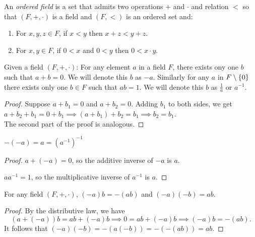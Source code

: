 \begin{defn} \label{defn:ordered field}
    An \emph{ordered field} is a set that admits two operations $+$ and $\cdot$ and relation $<$ so that $(F, +, \cdot)$ is a field and $(F, <)$ is an ordered set and:
    \begin{enumerate}[label=(O\arabic*)]
        \setcounter{enumi}{\value{temp}}
        \item \label{defn:order:sum}
            For $x, y, z \in F$, if $x < y$ then $x + z < y + z$.
        \item \label{defn:order:product}
            For $x, y \in F$, if $0 < x$ and $0 < y$ then $0 < x \cdot y$.
    \end{enumerate}
\end{defn}

\begin{lem} \label{thm:field:unique_inverses}
    Given a field $(F, +, \cdot)$: For any element $a$ in a field $F$, there exists ony one $b$ such that $a + b = 0$. We will denote this $b$ as $-a$. Similarly for any $a$ in $F \setminus \set{0}$ there exists only one $b \in F$ such that $ab = 1$. We will denote this $b$ as $\frac{1}{a}$ or $a^{-1}$.
\end{lem}
\begin{proof}
    Suppose $a + b_{1} = 0$ and $a + b_{2} = 0$. Adding $b_{1}$ to both sides, we get $a + b_{2} + b_{1} = 0 + b_{1} \implies (a + b_{1}) + b_{2} = b_{1} \implies b_{2} = b_{1}$. \\
    The second part of the proof is analogous.
\end{proof}

\begin{lem} \label{thm:field:inverse_involution}
    $-(-a) = a = (a^{-1})^{-1}$
\end{lem}
\begin{proof}
    $a + (-a) = 0$, so the additive inverse of $-a$ is $a$.

    $aa^{-1} = 1$, so the multiplicative inverse of $a^{-1}$ is $a$.
\end{proof}

\begin{lem} \label{thm:field:(-a)b=-(ab)}
    For any field $(F, +, \cdot)$, $(-a)b = -(ab)$ and $(-a)(-b) = ab$.
\end{lem}
\begin{proof}
    By the distributive law, we have \[
        (a + (-a))b = ab + (-a)b \implies 0 = ab + (-a)b \implies (-a)b = -(ab).
    \]
    It follows that $(-a)(-b) = -(a(-b)) = -(-(ab)) = ab$.
\end{proof}

